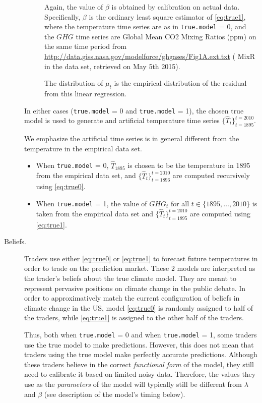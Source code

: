\documentclass[10pt,a4paper]{article}
\begin{document}
\begin{description}
\begin{description}
 			Again, the value of $\beta$ is obtained by calibration on actual data. Specifically, $\beta$ is the ordinary least square estimator of \eqref{eq:true1}, where the temperature time series are as in \texttt{true.model} = 0, and the $GHG$ time series are Global Mean CO2 Mixing Ratios (ppm) on the same time period from \url{http://data.giss.nasa.gov/modelforce/ghgases/Fig1A.ext.txt} ( MixR in the data set, retrieved on May 5th 2015). 
 			
 			The distribution of $\mu_t$ is the empirical distribution of the residual from this linear regression.
 		\end{description}

 		In either cases (\texttt{true.model} = 0 and \texttt{true.model} = 1), the chosen true model is used to generate and artificial temperature time series $\{\hat{T}_t\}_{t=1895}^{t=2010}$.

		We emphasize the artificial time series is in general different from the temperature in the empirical data set.	
		\begin{itemize}
			\item When  \texttt{true.model} = 0, $\hat{T}_{1895}$ is chosen to be the  temperature in 1895 from the empirical data set, and $\{\hat{T}_t\}_{t=1896}^{t=2010}$ are computed recursively using \eqref{eq:true0}.
			\item When  \texttt{true.model} = 1, the value of $GHG_t$ for all $t \in \{1895,\dots,2010\}$ is taken from the empirical data set and $\{\hat{T}_t\}_{t=1895}^{t=2010}$ are computed using \eqref{eq:true1}.
		\end{itemize}
		
	 	
 		
 		
 		
 		
 		\item[ Beliefs.]  Traders use either \eqref{eq:true0} or \eqref{eq:true1} to  forecast future temperatures in order to trade on the prediction market. These $2$ models are interpreted as the trader's beliefs about the true climate model. They are meant to represent pervasive positions on climate change in the public debate. In order to approximatively match the current configuration of beliefs in climate change in the US, model \eqref{eq:true0} is randomly assigned to half of the traders, while \eqref{eq:true1} is assigned to the other half of the traders.
 		
 		Thus, both when \texttt{true.model} = 0 and when  \texttt{true.model} = 1,  some traders use the true model to make predictions. However, this does not mean that traders using the true model make perfectly accurate predictions. Although these traders believe in the correct \emph{functional form} of the model, they still need to calibrate it based on limited noisy data. Therefore, the values they use as  the \emph{parameters} of the model will typically still be different from $\lambda$ and $\beta$ (see description of the model's timing below).
 		

\end{description}
\end{document}
